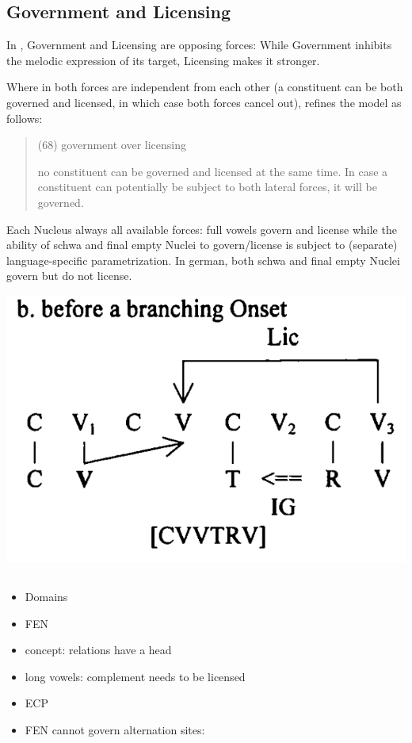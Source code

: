 \subsection{Government and Licensing}
\label{subsec:intro:gov lic}

In \CVCV, Government and Licensing are opposing forces:
While Government inhibits the melodic expression of
its target, Licensing makes it stronger.

Where in \cite{scheer2004} both forces are independent
from each other (a constituent can be both governed
and licensed, in which case both forces cancel out),
\cite{scheer2012} refines the model as follows:
\blockquote[\cite{scheer2012}]{
  (68) government over licensing
  
  no constituent can be governed and licensed at the
  same time. In case a constituent can potentially be
  subject to both lateral forces, it will be governed.
}

Each Nucleus always 
all available forces: full vowels govern and license
while the ability of schwa and final empty Nuclei to
govern/license is subject to (separate) language-specific
parametrization.
In german, both schwa and final empty Nuclei govern but
do not license.

\includegraphics[width=.5\textwidth]{figures/lic-over-branching-onset.png}


\subsection[TODO]{\TODO{}}
\begin{itemize}\color{red}
  \item Domains
  \item \gls{FEN}
  \item concept: relations have a head
  \item long vowels: complement needs to be licensed
  \item \gls{ECP}
  \item FEN cannot govern alternation sites:\\
\end{itemize}